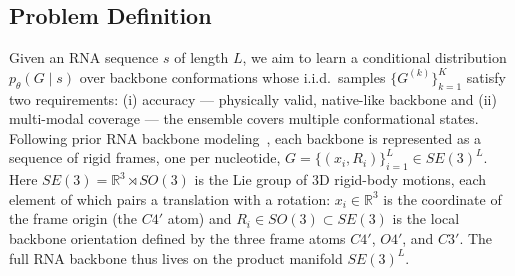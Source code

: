 \documentclass{article}
\begin{document}
\subsection{Problem Definition}


Given an RNA sequence $s$ of length $L$, we aim to learn a conditional distribution $p_\theta(G\mid s)$ over backbone conformations whose i.i.d.\ samples $\{G^{(k)}\}_{k=1}^K$ satisfy two requirements: (i) accuracy --- physically valid, native-like backbone and (ii) multi-modal coverage --- the ensemble covers multiple conformational states. Following prior RNA backbone modeling~\cite{anand2025rna}, each backbone is represented as a sequence of rigid frames, one per nucleotide, $G=\{(x_i, R_i)\}_{i=1}^L \in SE(3)^L$. Here $SE(3)=\mathbb{R}^3\rtimes SO(3)$ is the Lie group of 3D rigid-body motions, each element of which pairs a translation with a rotation: $x_i\in\mathbb{R}^3$ is the coordinate of the frame origin (the $C4'$ atom) and $R_i\in SO(3)\subset SE(3)$ is the local backbone orientation defined by the three frame atoms $C4'$, $O4'$, and $C3'$. The full RNA backbone thus lives on the product manifold $SE(3)^L$.

\end{document}

